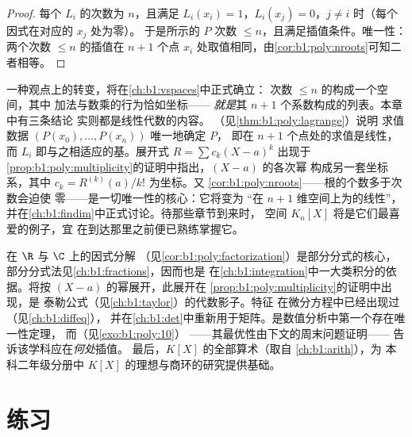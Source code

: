 \begin{proof}
每个 $L_i$ 的次数为 $n$，且满足 $L_i(x_i) = 1$，$L_i(x_j) =
0$，$j \neq i$ 时（每个因式在对应的 $x_j$ 处为零）。
于是所示的 $P$ 次数 $\leq n$，且满足插值条件。唯一性：
两个次数 $\leq n$ 的插值在 $n+1$
个点 $x_i$ 处取值相同，由\cref{cor:b1:poly:nroots}可知二者相等。
\end{proof}

\begin{remark}[插曲：多项式也是向量]\label{rem:b1:poly:interlude}
一种观点上的转变，将在\cref{ch:b1:vspaces}中正式确立：
次数 $\leq n$ 的构成一个空间，其中
加法与数乘的行为恰如坐标——
\emph{就是}其 $n + 1$ 个系数构成的列表。本章中有三条结论
实则都是线性代数的内容。
（见\cref{thm:b1:poly:lagrange}）说明
求值数据 $(P(x_0), \dots, P(x_n))$ 唯一地确定 $P$，
即在 $n + 1$ 个点处的求值是线性，
而 $L_i$ 即与之相适应的基。展开式 $R =
\sum c_k(X - a)^k$ 出现于
\cref{prop:b1:poly:multiplicity}的证明中指出，$(X - a)$ 的各次幂
构成另一套坐标系，其中 $c_k =
R^{(k)}(a)/k!$ 为坐标。又
\cref{cor:b1:poly:nroots}——根的个数多于次数会迫使
零——是一切唯一性的核心：它将变为
“在 $n + 1$ 维空间上为的线性”，
并在\cref{ch:b1:findim}中正式讨论。待那些章节到来时，
空间 $K_n[X]$ 将是它们最喜爱的例子，宜
在到达那里之前便已熟练掌握它。
\end{remark}

\begin{remark}[本章的应用]\label{rem:b1:poly:whereused}
在 $\R$ 与 $\C$ 上的因式分解
（见\cref{cor:b1:poly:factorization}）是部分分式的核心，
部分分式法见\cref{ch:b1:fractions}，因而也是
在\cref{ch:b1:integration}中一大类积分的依据。将按
$(X - a)$ 的幂展开，此展开在
\cref{prop:b1:poly:multiplicity}的证明中出现，是
泰勒公式（见\cref{ch:b1:taylor}）的代数影子。特征
在微分方程中已经出现过（见\cref{ch:b1:diffeq}），
并在\cref{ch:b1:det}中重新用于矩阵。是数值分析中第一个存在唯一性定理，
而（见\cref{exo:b1:poly:10}）
——其最优性由下文的周末问题证明——
告诉该学科应在\emph{何处}插值。
最后，$K[X]$ 的全部算术（取自
\cref{ch:b1:arith}），为
本科二年级分册中 $K[X]$ 的理想与商环的研究提供基础。
\end{remark}

\section{练习}

